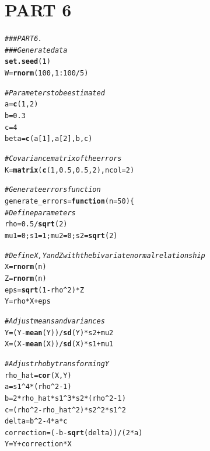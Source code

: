 \documentclass[11pt]{article}\usepackage[]{graphicx}\usepackage[]{color}
\makeatletter
\newcommand{\hlnum}[1]{\textcolor[rgb]{0.686,0.059,0.569}{#1}}%
\newcommand{\hlcom}[1]{\textcolor[rgb]{0.678,0.584,0.686}{\textit{#1}}}%
\newcommand{\hlopt}[1]{\textcolor[rgb]{0,0,0}{#1}}%
\newcommand{\hlstd}[1]{\textcolor[rgb]{0.345,0.345,0.345}{#1}}%
\newcommand{\hlkwa}[1]{\textcolor[rgb]{0.161,0.373,0.58}{\textbf{#1}}}%
\newcommand{\hlkwb}[1]{\textcolor[rgb]{0.69,0.353,0.396}{#1}}%
\newcommand{\hlkwc}[1]{\textcolor[rgb]{0.333,0.667,0.333}{#1}}%
\newcommand{\hlkwd}[1]{\textcolor[rgb]{0.737,0.353,0.396}{\textbf{#1}}}%
\newenvironment{kframe}{%
 \def\at@end@of@kframe{}%
 \ifinner\ifhmode%
  \def\at@end@of@kframe{\end{minipage}}%
  \begin{minipage}{\columnwidth}%
 \fi\fi%
 \def\FrameCommand##1{\hskip\@totalleftmargin \hskip-\fboxsep
 \colorbox{shadecolor}{##1}\hskip-\fboxsep
     \hskip-\linewidth \hskip-\@totalleftmargin \hskip\columnwidth}%
 \MakeFramed {\advance\hsize-\width
   \@totalleftmargin\z@ \linewidth\hsize
   \@setminipage}}%
 {\par\unskip\endMakeFramed%
 \at@end@of@kframe}
\newenvironment{knitrout}{}{} %
\makeatother
\begin{document}
\section{PART 6}
\begin{knitrout}
\color{fgcolor}\begin{kframe}
\begin{alltt}
\hlcom{### PART 6.}
\hlcom{### Generate data}
\hlkwd{set.seed}\hlstd{(}\hlnum{1}\hlstd{)}
\hlstd{W} \hlkwb{=} \hlkwd{rnorm}\hlstd{(}\hlnum{100}\hlstd{,}\hlnum{1}\hlopt{:}\hlnum{100}\hlopt{/}\hlnum{5}\hlstd{)}

\hlcom{# Parameters to be estimated}
\hlstd{a} \hlkwb{=} \hlkwd{c}\hlstd{(}\hlnum{1}\hlstd{,}\hlnum{2}\hlstd{)}
\hlstd{b} \hlkwb{=} \hlnum{0.3}
\hlstd{c} \hlkwb{=} \hlnum{4}
\hlstd{beta} \hlkwb{=} \hlkwd{c}\hlstd{(a[}\hlnum{1}\hlstd{],a[}\hlnum{2}\hlstd{],b,c)}

\hlcom{# Covariance matrix of the errors}
\hlstd{K} \hlkwb{=} \hlkwd{matrix}\hlstd{(}\hlkwd{c}\hlstd{(}\hlnum{1}\hlstd{,}\hlnum{0.5}\hlstd{,}\hlnum{0.5}\hlstd{,}\hlnum{2}\hlstd{),}\hlkwc{ncol}\hlstd{=}\hlnum{2}\hlstd{)}

\hlcom{# Generate errors function}
\hlstd{generate_errors} \hlkwb{=} \hlkwa{function}\hlstd{(}\hlkwc{n} \hlstd{=} \hlnum{50}\hlstd{)\{}
  \hlcom{# Define parameters}
  \hlstd{rho} \hlkwb{=} \hlnum{0.5}\hlopt{/}\hlkwd{sqrt}\hlstd{(}\hlnum{2}\hlstd{)}
  \hlstd{mu1}\hlkwb{=}\hlnum{0}\hlstd{; s1}\hlkwb{=}\hlnum{1}\hlstd{; mu2}\hlkwb{=}\hlnum{0}\hlstd{; s2}\hlkwb{=}\hlkwd{sqrt}\hlstd{(}\hlnum{2}\hlstd{)}

  \hlcom{# Define X, Y and Z with the bivariate normal relationship}
  \hlstd{X} \hlkwb{=} \hlkwd{rnorm}\hlstd{(n)}
  \hlstd{Z} \hlkwb{=} \hlkwd{rnorm}\hlstd{(n)}
  \hlstd{eps} \hlkwb{=} \hlkwd{sqrt}\hlstd{(}\hlnum{1}\hlopt{-}\hlstd{rho}\hlopt{^}\hlnum{2}\hlstd{)} \hlopt{*} \hlstd{Z}
  \hlstd{Y} \hlkwb{=} \hlstd{rho} \hlopt{*} \hlstd{X} \hlopt{+} \hlstd{eps}

  \hlcom{# Adjust means and variances}
  \hlstd{Y} \hlkwb{=} \hlstd{(Y}\hlopt{-}\hlkwd{mean}\hlstd{(Y))}\hlopt{/}\hlkwd{sd}\hlstd{(Y)}\hlopt{*}\hlstd{s2}\hlopt{+}\hlstd{mu2}
  \hlstd{X} \hlkwb{=} \hlstd{(X}\hlopt{-}\hlkwd{mean}\hlstd{(X))}\hlopt{/}\hlkwd{sd}\hlstd{(X)}\hlopt{*}\hlstd{s1}\hlopt{+}\hlstd{mu1}

  \hlcom{# Adjust rho by transforming Y}
  \hlstd{rho_hat} \hlkwb{=} \hlkwd{cor}\hlstd{(X,Y)}
  \hlstd{a} \hlkwb{=} \hlstd{s1}\hlopt{^}\hlnum{4}\hlopt{*}\hlstd{(rho}\hlopt{^}\hlnum{2}\hlopt{-}\hlnum{1}\hlstd{)}
  \hlstd{b} \hlkwb{=} \hlnum{2}\hlopt{*}\hlstd{rho_hat}\hlopt{*}\hlstd{s1}\hlopt{^}\hlnum{3}\hlopt{*}\hlstd{s2}\hlopt{*}\hlstd{(rho}\hlopt{^}\hlnum{2}\hlopt{-}\hlnum{1}\hlstd{)}
  \hlstd{c} \hlkwb{=} \hlstd{(rho}\hlopt{^}\hlnum{2}\hlopt{-}\hlstd{rho_hat}\hlopt{^}\hlnum{2}\hlstd{)}\hlopt{*}\hlstd{s2}\hlopt{^}\hlnum{2}\hlopt{*}\hlstd{s1}\hlopt{^}\hlnum{2}
  \hlstd{delta} \hlkwb{=} \hlstd{b}\hlopt{^}\hlnum{2}\hlopt{-}\hlnum{4}\hlopt{*}\hlstd{a}\hlopt{*}\hlstd{c}
  \hlstd{correction} \hlkwb{=} \hlstd{(}\hlopt{-}\hlstd{b}\hlopt{-}\hlkwd{sqrt}\hlstd{(delta))}\hlopt{/}\hlstd{(}\hlnum{2}\hlopt{*}\hlstd{a)}
  \hlstd{Y}\hlkwb{=}\hlstd{Y}\hlopt{+}\hlstd{correction}\hlopt{*}\hlstd{X}


\end{alltt}
\end{kframe}
\end{knitrout}
\end{document}
